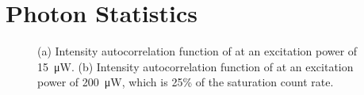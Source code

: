 



\section[g2 Measurements]{Photon Statistics} \label{sec::g2}



	\begin{figure}[tp]
		\begin{subfigure}[tp]{ 0.49\linewidth}
			\caption{}\label{subfig::g2_a}
			\centering
		\end{subfigure}
		\hfill
		\begin{subfigure}[tp]{ 0.49\linewidth}
			\caption{}\label{subfig::g2_b}
			\centering
		\end{subfigure}
		\caption{(a) Intensity autocorrelation function of \emnarrow at an excitation power of \SI{15}{\micro\W}. (b) Intensity autocorrelation function of \embroad at an excitation power of \SIlist{200}{\micro\W}, which is 25\% of the saturation count rate.}
		\label{fig::g2}
	\end{figure}


